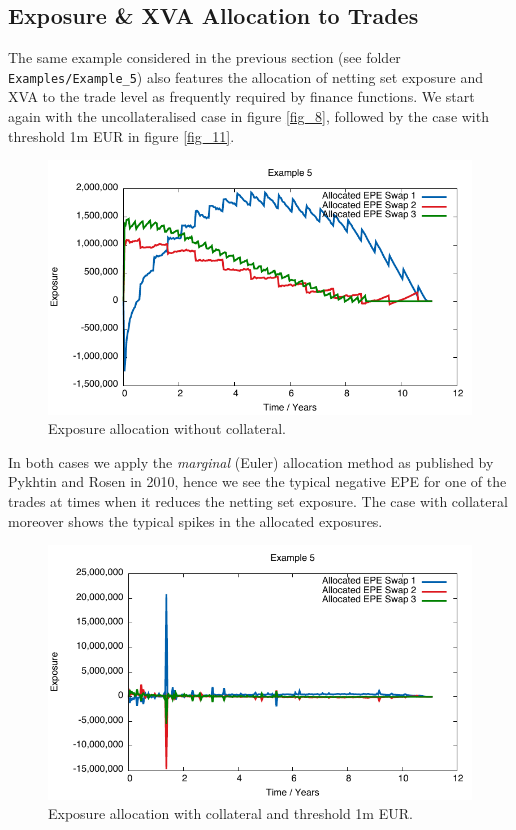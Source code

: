 \documentclass[12pt, a4paper]{article}
\begin{document}
\subsection{Exposure \& XVA Allocation to Trades}

The same example considered in the previous section (see folder {\tt Examples/Example\_5}) also features the allocation of netting set exposure and XVA to the trade level as frequently required by finance functions.  We start again with the uncollateralised case in figure \ref{fig_8}, followed by the case with threshold 1m EUR in figure \ref{fig_11}.
\begin{figure}[hbt]
\begin{center}
\includegraphics[scale=1.0]{example_nocollateral_allocated_epe.pdf}
\end{center}
\caption{Exposure allocation without collateral.}
\label{fig_12}
\end{figure}
In both cases we apply the {\em marginal} (Euler) allocation method as published by Pykhtin and Rosen in 2010, hence we see the typical negative EPE for one of the trades at times when it reduces the netting set exposure. The case with collateral moreover shows the typical spikes in the allocated exposures.
\begin{figure}[hbt]
\begin{center}
\includegraphics[scale=1.0]{example_threshold_allocated_epe.pdf}
\end{center}
\caption{Exposure allocation with collateral and threshold 1m EUR.}
\label{fig_13}
\end{figure}
\end{document}
